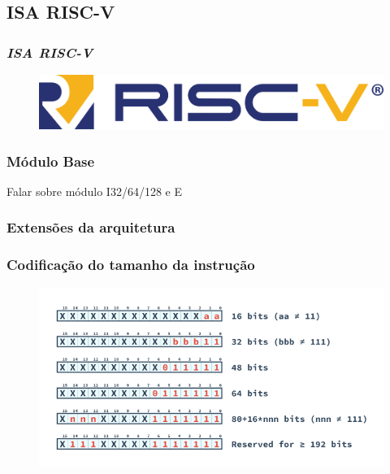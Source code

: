 \documentclass[aspectratio=169]{beamer}
\begin{document}
    \subsection{ISA RISC-V}
    \begin{frame}
        \vfill
        \frametitle{\textit{\textbf{ISA RISC-V}}}
        \begin{figure}[H]
        \centering
            \includegraphics[width=.9\textwidth,height=.9\textheight,keepaspectratio]{../images/riscv_logo.png}
        \end{figure}
        \vfill
    \end{frame}

    \begin{frame}
        \frametitle{Módulo Base}
        \vfill
        {Falar sobre módulo I32/64/128 e E}
        \vfill
    \end{frame}

    \begin{frame}
        \frametitle{Extensões da arquitetura}
        \vfill
        {}
        \vfill
    \end{frame}

    \begin{frame}
        \frametitle{Codificação do tamanho da instrução}
        \vfill
        \begin{figure}[H]
        \centering
            \includegraphics[width=.9\textwidth,height=.9\textheight,keepaspectratio]{../images/RV_InstructionLength.png}
        \end{figure}
        \vfill
    \end{frame}
\end{document}
